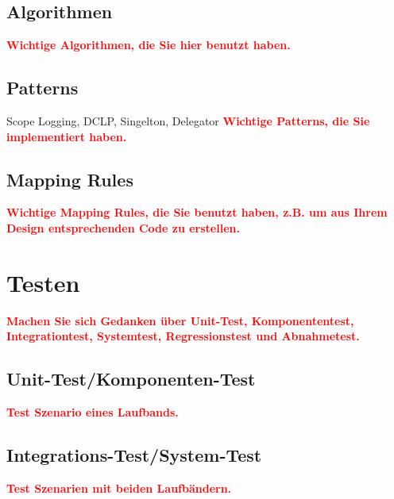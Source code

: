 \documentclass[oneside,a4paper,titlepage]{scrartcl} %
\begin{document}
\subsection{Algorithmen}
\textcolor{red}{\textbf{Wichtige Algorithmen, die Sie hier benutzt haben.}}

\subsection{Patterns}
Scope Logging, DCLP, Singelton, Delegator \newline
\textcolor{red}{\textbf{Wichtige Patterns, die Sie implementiert haben.}}

\subsection{Mapping Rules}
\textcolor{red}{\textbf{Wichtige Mapping Rules, die Sie benutzt haben, z.B.
um aus Ihrem Design entsprechenden Code zu erstellen.}}

\newpage

\section{Testen}
\textcolor{red}{\textbf{Machen Sie sich Gedanken über Unit-Test, Komponententest,
Integrationtest, Systemtest, Regressionstest und Abnahmetest.}}

\subsection{Unit-Test/Komponenten-Test}
\textcolor{red}{\textbf{Test Szenario eines Laufbands.}}

\subsection{Integrations-Test/System-Test}
\textcolor{red}{\textbf{Test Szenarien mit beiden Laufbändern.}}

\end{document}
